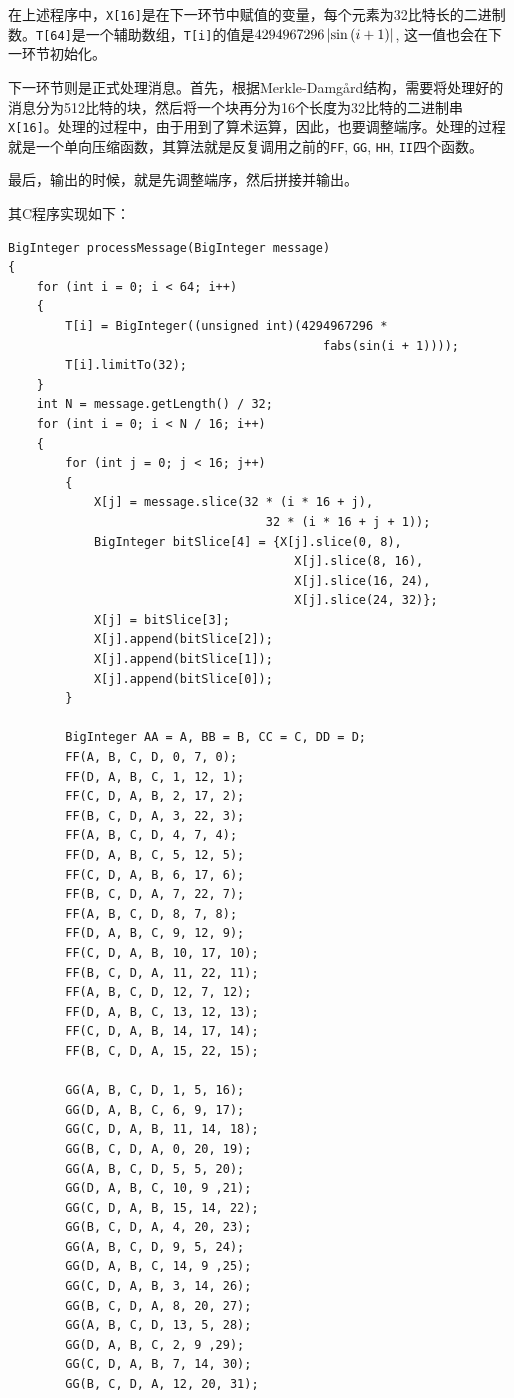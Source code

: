 在上述程序中，\verb`X[16]`是在下一环节中赋值的变量，每个元素为32比特长的二进制数。\verb`T[64]`是一个辅助数组，\verb`T[i]`的值是$4294967296\left| \sin\left( {i+1}\right) \right|$, 这一值也会在下一环节初始化。\par
下一环节则是正式处理消息。首先，根据Merkle-Damg\aa rd结构，需要将处理好的消息分为512比特的块，然后将一个块再分为16个长度为32比特的二进制串\verb`X[16]`。处理的过程中，由于用到了算术运算，因此，也要调整端序。处理的过程就是一个单向压缩函数，其算法就是反复调用之前的\verb`FF`, \verb`GG`, \verb`HH`, \verb`II`四个函数。\par
最后，输出的时候，就是先调整端序，然后拼接并输出。\par
其C程序实现如下：
\begin{prove}
\begin{verbatim}
BigInteger processMessage(BigInteger message)
{
    for (int i = 0; i < 64; i++)
    {
        T[i] = BigInteger((unsigned int)(4294967296 * 
                                            fabs(sin(i + 1))));
        T[i].limitTo(32);
    }
    int N = message.getLength() / 32;
    for (int i = 0; i < N / 16; i++)
    {
        for (int j = 0; j < 16; j++)
        {
            X[j] = message.slice(32 * (i * 16 + j), 
                                    32 * (i * 16 + j + 1));
            BigInteger bitSlice[4] = {X[j].slice(0, 8), 
                                        X[j].slice(8, 16), 
                                        X[j].slice(16, 24), 
                                        X[j].slice(24, 32)};
            X[j] = bitSlice[3];
            X[j].append(bitSlice[2]);
            X[j].append(bitSlice[1]);
            X[j].append(bitSlice[0]);
        }
        
        BigInteger AA = A, BB = B, CC = C, DD = D;
        FF(A, B, C, D, 0, 7, 0);
        FF(D, A, B, C, 1, 12, 1);
        FF(C, D, A, B, 2, 17, 2);
        FF(B, C, D, A, 3, 22, 3);
        FF(A, B, C, D, 4, 7, 4);
        FF(D, A, B, C, 5, 12, 5);
        FF(C, D, A, B, 6, 17, 6);
        FF(B, C, D, A, 7, 22, 7);
        FF(A, B, C, D, 8, 7, 8);
        FF(D, A, B, C, 9, 12, 9);
        FF(C, D, A, B, 10, 17, 10);
        FF(B, C, D, A, 11, 22, 11);
        FF(A, B, C, D, 12, 7, 12);
        FF(D, A, B, C, 13, 12, 13);
        FF(C, D, A, B, 14, 17, 14);
        FF(B, C, D, A, 15, 22, 15);
        
        GG(A, B, C, D, 1, 5, 16);
        GG(D, A, B, C, 6, 9, 17);
        GG(C, D, A, B, 11, 14, 18);
        GG(B, C, D, A, 0, 20, 19);
        GG(A, B, C, D, 5, 5, 20);
        GG(D, A, B, C, 10, 9 ,21);
        GG(C, D, A, B, 15, 14, 22);
        GG(B, C, D, A, 4, 20, 23);
        GG(A, B, C, D, 9, 5, 24);
        GG(D, A, B, C, 14, 9 ,25);
        GG(C, D, A, B, 3, 14, 26);
        GG(B, C, D, A, 8, 20, 27);
        GG(A, B, C, D, 13, 5, 28);
        GG(D, A, B, C, 2, 9 ,29);
        GG(C, D, A, B, 7, 14, 30);
        GG(B, C, D, A, 12, 20, 31);
        

\end{verbatim}
\end{prove}
